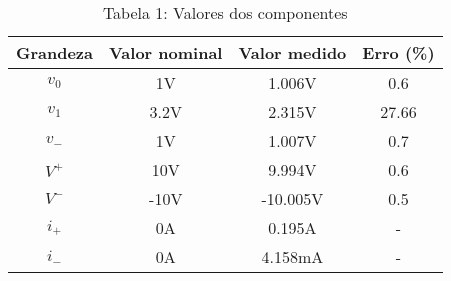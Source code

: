 \vspace{5pt}
\begin{table}[h]
\centering
\begin{tabular}{|c|c|c|c|}
\hline
\textbf{Grandeza} & \textbf{Valor nominal} & \textbf{Valor medido} & \textbf{Erro (\%) }\\\hline
$v_0$ & 1V & 1.006V & 0.6 \\\hline
$v_1$ & 3.2V & 2.315V & 27.66 \\\hline
$v_-$ & 1V & 1.007V & 0.7 \\\hline
$V^+$ & 10V & 9.994V & 0.6 \\\hline
$V^-$ & -10V & -10.005V & 0.5 \\\hline
$i_+$ & 0A & 0.195A & - \\\hline
$i_-$ & 0A & 4.158mA & - \\\hline
\end{tabular}
\caption*{Tabela 1: Valores dos componentes}
\end{table}